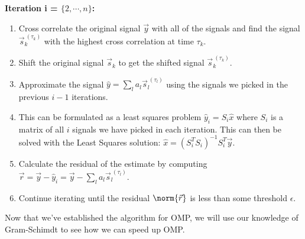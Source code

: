 \textbf{Iteration i = $\{2, \cdots, n\}$:}
\begin{enumerate}[label=(\arabic*)]
  \item Cross correlate the original signal $\vec{y}$ with all of the signals and find the signal $\vec{s}_{k}^{\ ({\tau_{k}})}$ with the highest cross correlation at time $\tau_{k}.$
  \item Shift the original signal $\vec{s}_{k}$ to get the shifted signal $\vec{s}_{k}^{\ (\tau_{k})}.$
  \item Approximate the signal $\hat{y} = \sum\limits_{l} a_{l} \vec{s}_{l}^{\ (\tau_{l})}$ using the signals we picked in the previous $i - 1$ iterations. 
  \item This can be formulated as a least squares problem $\hat{y}_{i} = S_{i} \hat{x}$ where $S_{i}$ is a matrix of all $i$ signals we have picked in each iteration. This can then be solved with the Least Squares solution: $\hat{x} = (S_{i}^{T} S_{i})^{-1} S_{i}^{T} \vec{y}
  .$
  \item Calculate the residual of the estimate by computing $\vec{r} = \vec{y} - \hat{y}_{i} = \vec{y} - \sum\limits_{l} a_{l} \vec{s}_{l}^{\ (\tau_{l})}.$
  \item Continue iterating until the residual $\norm{\vec{r}}$ is less than some threshold $\epsilon.$
\end{enumerate}

Now that we've established the algorithm for OMP, we will use our knowledge of Gram-Schimdt to see how we can speed up OMP.

\newpage 

